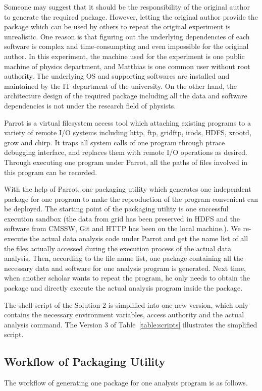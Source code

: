 \documentclass{acm_proc_article-sp}
\begin{document}
Someone may suggest that it should be the responsibility of the original author
to generate the required package. However, letting the original author provide
the package which can be used by others to repeat the original experiment is
unrealistic. One reason is that figuring out the underlying dependencies of
each software is complex and time-consumpting and even impossible for the
original author. In this experiment, the machine used for the experiment is one
public machine of physics department, and Matthias is one common user without
root authority. The underlying OS and supporting softwares are installed and
maintained by the IT department of the university. On the other hand, the
architecture design of the required package including all the data and software
dependencies is not under the research field of physists.

Parrot is a virtual filesystem access tool which attaching existing programs to
a variety of remote I/O systems including http, ftp, gridftp, irods, HDFS,
xrootd, grow and chirp. It traps all system calls of one program through ptrace
debugging interface, and replaces them with remote I/O operations as desired.
Through executing one program under Parrot, all the paths of files involved in
this program can be recorded.  

With the help of Parrot, one packaging utility which generates one independent
package for one program to make the reproduction of the program convenient can
be deployed. The starting point of the packaging utility is one successful execution
sandbox (the data from grid has been preserved in HDFS and the software from
CMSSW, Git and HTTP has been on the local machine.). We re-execute the actual
data analysis code under Parrot and get the name list of all the files actually
accessed during the execution process of the actual data analysis. Then,
according to the file name list, one package containing all the necessary data
and software for one analysis program is generated. Next time, when another
scholar wants to repeat the program, he only needs to obtain the package and
directly execute the actual analysis program inside the package.

The shell script of the Solution 2 is simplified into one new version, which
only contains the necessary environment variables, access authority and the
actual analysis command. The Version 3 of Table~\ref{table:scripts} illustrates
the simplified script.

\subsection{Workflow of Packaging Utility}
The workflow of generating one package for one analysis program is as follows.
\end{document}
